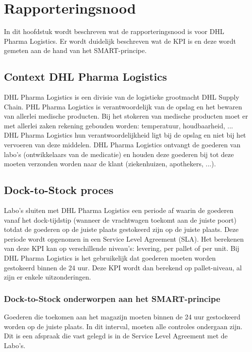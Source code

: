 
\chapter{Rapporteringsnood}
\label{ch:rapporteringsnood}
In dit hoofdstuk wordt beschreven wat de rapporteringsnood is voor DHL Pharma Logistics. Er wordt duidelijk beschreven wat de KPI is en deze wordt gemeten aan de hand van het SMART-principe. 

\section{Context DHL Pharma Logistics}
DHL Pharma Logistics is een divisie van de logistieke grootmacht DHL Supply Chain. PHL Pharma Logistics is verantwoordelijk van de opslag en het bewaren van allerlei medische producten. Bij het stokeren van medische producten moet er met allerlei zaken rekening gebouden worden: temperatuur, houdbaarheid, ... DHL Pharma Logistics hun verantwoordelijkheid ligt bij de opslag en niet bij het vervoeren van deze middelen. DHL Pharma Logistics ontvangt de goederen van labo's (ontwikkelaars van de medicatie) en houden deze goederen bij tot deze moeten verzonden worden naar de klant (ziekenhuizen, apothekers, ...).

\section{Dock-to-Stock proces}
Labo's sluiten met DHL Pharma Logistics een periode af waarin de goederen vanaf het dock-tijdstip (wanneer de vrachtwagen toekomt aan de juiste poort) totdat de goederen op de juiste plaats gestokeerd zijn op de juiste plaats.
Deze periode wordt opgenomen in een Service Level Agreement (SLA). Het berekenen van deze KPI kan op verschillende niveau's: levering, per pallet of per unit. Bij DHL Pharma Logistics is het gebruikelijk dat goederen moeten worden gestokeerd binnen de 24 uur. Deze KPI wordt dan berekend op pallet-niveau, al zijn er enkele uitzonderingen.

\subsection{Dock-to-Stock onderworpen aan het SMART-principe}
Goederen die toekomen aan het magazijn moeten binnen de 24 uur gestockeerd worden op de juiste plaats. In dit interval, moeten alle controles ondergaan zijn. Dit is een afspraak die vast gelegd is in de Service Level Agreement met de Labo's.

